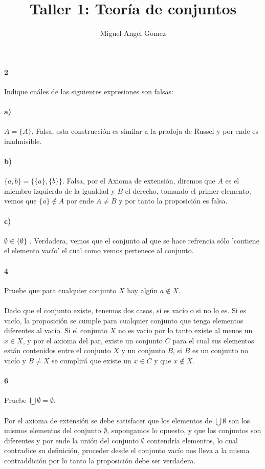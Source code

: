 \documentclass{article}
\title{Taller 1: Teoría de conjuntos}
\author{Miguel Angel Gomez}
\begin{document}
\maketitle
\paragraph{2} Indique cuáles de las siguientes expresiones son falsas:
\paragraph{a)} $A = \{ A \}$. Falsa, esta construcción es similar a la pradoja de Russel y por ende es inadmisible.
\paragraph{b)} $\{ a, b \} = \{ \{a\}, \{b\} \}$. Falsa, por el Axioma de extensión, diremos que $A$ es el miembro izquierdo de la igualdad y $B$ el derecho, tomando el primer elemento, vemos que $\{a\} \notin A$ por ende $A \neq B$ y por tanto la proposición es falsa.
\paragraph{c)} $\emptyset \in \{\emptyset\}$ . Verdadera, vemos que el conjunto al que se hace refrencia sólo 'contiene el elemento vacío' el cual como vemos pertenece al conjunto.
\paragraph{4} Pruebe que para cualquier conjunto $X$ hay algún $a \notin X$.
\paragraph{} Dado que el conjunto existe, tenemos dos casos, si es vacío o si no lo es. Si es vacío, la proposición se cumple para cualquier conjunto que tenga elementos diferentes al vacío. Si el conjunto $X$ no es vacio por lo tanto existe al menos un $x \in X$, y por el axioma del par, existe un conjunto $C$ para el cual sus elementos están contenidos entre el conjunto $X$ y un conjunto $B$, si $B$ es un conjunto no vacío y $B \neq X$ se cumplirá que existe un $x \in C$ y que $x \notin X$.
\paragraph{6} Pruebe $\bigcup\emptyset = \emptyset$.
\paragraph{} Por el axioma de extensión se debe satisfacer que los elementos de $\bigcup \emptyset$ son los mismos elementos del conjunto $\emptyset$, supongamos lo opuesto, y que los conjuntos son diferentes y por ende la unión del conjunto $\emptyset$ contendría elementos, lo cual contradice su definición, proceder desde el conjunto vacío nos lleva a la misma contraddición por lo tanto la proposición debe ser verdadera.
\end{document}

